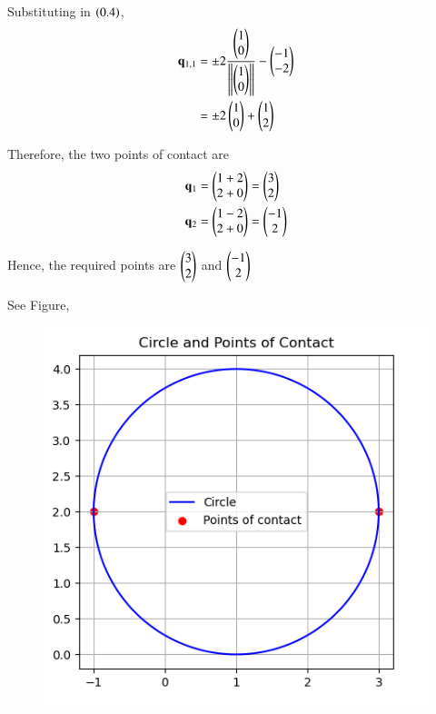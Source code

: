 \documentclass[journal]{IEEEtran}
\begin{document}
Substituting in $\left(0.4\right)$,
\begin{align}
\mathbf{q}_{1,1} 
&= \pm 2 \frac{\begin{pmatrix}1 \\ 0\end{pmatrix}}{\left\lVert\begin{pmatrix}1 \\ 0\end{pmatrix}\right\rVert} - \begin{pmatrix}-1 \\ -2\end{pmatrix}\\
&= \pm 2\begin{pmatrix}1 \\ 0\end{pmatrix} + \begin{pmatrix}1 \\ 2\end{pmatrix}
\end{align}

Therefore, the two points of contact are
\begin{align}
\mathbf{q}_1 &= \begin{pmatrix}1+2 \\ 2+0\end{pmatrix} = \begin{pmatrix}3 \\ 2\end{pmatrix}\\
\mathbf{q}_2 &= \begin{pmatrix}1-2 \\ 2+0\end{pmatrix} = \begin{pmatrix}-1 \\ 2\end{pmatrix}
\end{align}

Hence, the required points are  $\begin{pmatrix}3 \\ 2\end{pmatrix}$ and $\begin{pmatrix}-1 \\ 2\end{pmatrix}$

See Figure,
\begin{figure}[h!]
    \centering
    \includegraphics[height=0.5\textheight, keepaspectratio]{figs/fig.png}
    \label{figure_1}
\end{figure}
\end{document}
